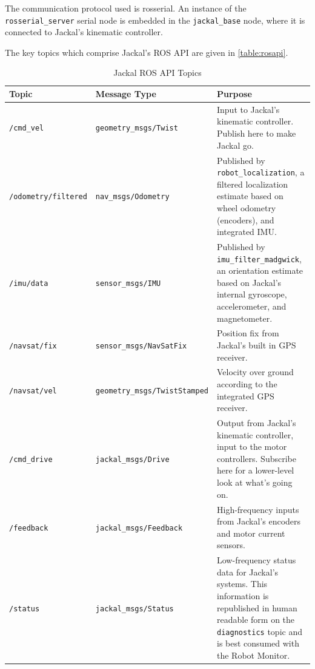 \documentclass[]{clearpath-latex/clearpath-manual}
\begin{document}
The communication protocol used is rosserial. An instance of the \lstinline{rosserial_server}
serial node is embedded in the \lstinline{jackal_base} node, where it is connected to
Jackal's kinematic controller.

The key topics which comprise Jackal's ROS API are given in \autoref{table:rosapi}.

\bgroup
\begin{table}[htp]
\begin{tabular}{  l  l  p{7cm} }
\hline
Topic & Message Type & Purpose \\ \hline

\lstinline!/cmd_vel! & \lstinline!geometry_msgs/Twist! &
Input to Jackal's kinematic controller. Publish here to make Jackal go. \\ \hline
\lstinline!/odometry/filtered! & \lstinline!nav_msgs/Odometry! &
Published by \lstinline!robot_localization!, a filtered localization estimate based
on wheel odometry (encoders), and integrated IMU. \\ \hline

\lstinline!/imu/data! & \lstinline!sensor_msgs/IMU! &
Published by \lstinline!imu_filter_madgwick!, an orientation estimate based on Jackal's
internal gyroscope, accelerometer, and magnetometer. \\ \hline
\lstinline!/navsat/fix! & \lstinline!sensor_msgs/NavSatFix! &
Position fix from Jackal's built in GPS receiver. \\ \hline
\lstinline!/navsat/vel! & \lstinline!geometry_msgs/TwistStamped! &
Velocity over ground according to the integrated GPS receiver.\\ \hline

\lstinline!/cmd_drive! & \lstinline!jackal_msgs/Drive! &
Output from Jackal's kinematic controller, input to the motor controllers. Subscribe here for a lower-level look at what's going on. \\ \hline
\lstinline!/feedback! & \lstinline!jackal_msgs/Feedback! &
High-frequency inputs from Jackal's encoders and motor current sensors. \\ \hline
\lstinline!/status! & \lstinline!jackal_msgs/Status! &
Low-frequency status data for Jackal's systems. This information is republished in human
readable form on the \lstinline!diagnostics! topic and is best consumed with the Robot
Monitor. \\ \hline
\end{tabular}
\caption{Jackal ROS API Topics}
\label{table:rosapi}
\end{table}
\egroup
\end{document}
